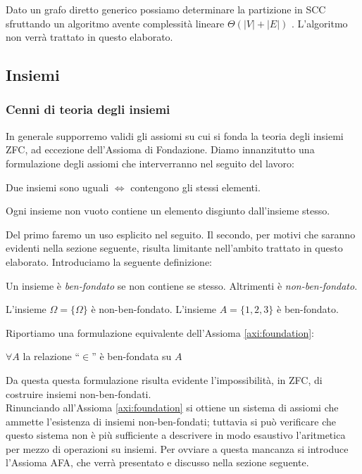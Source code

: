Dato un grafo diretto generico possiamo determinare la partizione in SCC sfruttando un algoritmo avente complessità lineare $\Theta(|V| + |E|)$ \cite{tarjan}. L'algoritmo non verrà trattato in questo elaborato.

\subsection{Insiemi}
\subsubsection{Cenni di teoria degli insiemi}
In generale supporremo validi gli assiomi su cui si fonda la teoria degli insiemi ZFC, ad eccezione dell'Assioma di Fondazione. Diamo innanzitutto una formulazione degli assiomi che interverranno nel seguito del lavoro:
\begin{axiom}[di estensionalità]
    Due insiemi sono uguali $\iff$ contengono gli stessi elementi.
\end{axiom}
\begin{axiom}[di fondazione]
    Ogni insieme non vuoto contiene un elemento disgiunto dall'insieme stesso.
    \label{axi:foundation}
\end{axiom}
Del primo faremo un uso esplicito nel seguito. Il secondo, per motivi che saranno evidenti nella sezione seguente, risulta limitante nell'ambito trattato in questo elaborato. Introduciamo la seguente definizione:
\begin{definition}
    Un insieme è \emph{ben-fondato} se non contiene se stesso. Altrimenti è \emph{non-ben-fondato}.
\end{definition}
\begin{example}
    L'insieme $\Omega = \{\Omega\}$ è non-ben-fondato. L'insieme $A = \{1,2,3\}$ è ben-fondato.
\end{example}
Riportiamo una formulazione equivalente dell'Assioma \ref{axi:foundation}:
\begin{axiom*}
    $\forall A$ la relazione ``$\in$'' è ben-fondata su $A$ \cite[Chapter III.4]{kunen}
\end{axiom*}
Da questa questa formulazione risulta evidente l'impossibilità, in ZFC, di costruire insiemi non-ben-fondati.\\
Rinunciando all'Assioma \ref{axi:foundation} si ottiene un sistema di assiomi che ammette l'esistenza di insiemi non-ben-fondati; tuttavia si può verificare che questo sistema non è più sufficiente a descrivere in modo esaustivo l'aritmetica per mezzo di operazioni su insiemi. Per ovviare a questa mancanza si introduce l'Assioma AFA, che verrà presentato e discusso nella sezione seguente.

